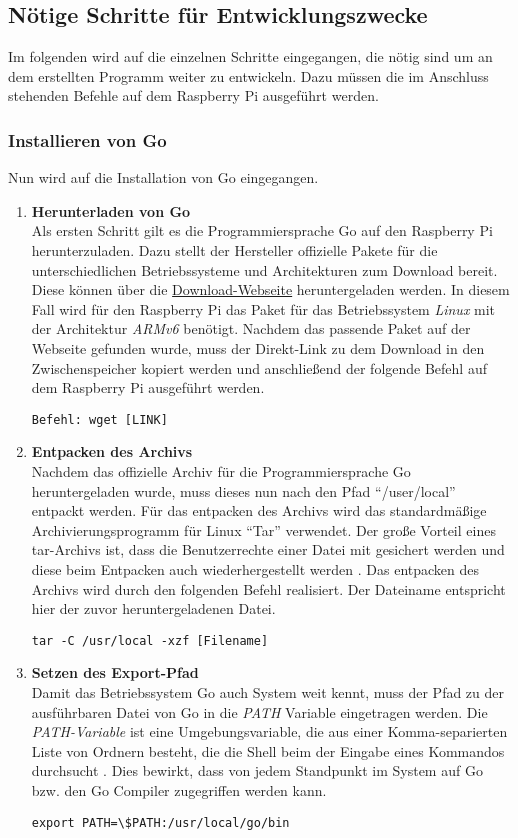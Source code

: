\subsection{Nötige Schritte für Entwicklungszwecke}
Im folgenden wird auf die einzelnen Schritte eingegangen, die nötig sind um an dem erstellten Programm weiter zu entwickeln. Dazu müssen die im Anschluss stehenden Befehle auf dem Raspberry Pi ausgeführt werden.
\subsubsection{Installieren von Go}
Nun wird auf die Installation von Go eingegangen.
\begin{enumerate}
\item \textbf{Herunterladen von Go}  \\
Als ersten Schritt gilt es die Programmiersprache Go auf den Raspberry Pi herunterzuladen. Dazu stellt der Hersteller offizielle Pakete für die unterschiedlichen Betriebssysteme und Architekturen zum Download bereit. Diese können über die \href{https://golang.org/dl/}{Download-Webseite} heruntergeladen werden. In diesem Fall wird für den Raspberry Pi das Paket für das Betriebssystem \textit{Linux} mit der Architektur \textit{ARMv6} benötigt. Nachdem das passende Paket auf der Webseite gefunden wurde, muss der Direkt-Link zu dem Download in den Zwischenspeicher kopiert werden und anschließend der folgende Befehl auf dem Raspberry Pi ausgeführt werden.
\begin{lstlisting}
Befehl: wget [LINK]
\end{lstlisting}

\item \textbf{Entpacken des Archivs}  \\
Nachdem das offizielle Archiv für die Programmiersprache Go heruntergeladen wurde, muss dieses nun nach den Pfad \enquote{/user/local} entpackt werden. Für das entpacken des Archivs wird das standardmäßige Archivierungsprogramm für Linux \enquote{\ac{Tar}} verwendet. Der große Vorteil eines tar-Archivs ist, dass die Benutzerrechte einer Datei mit gesichert werden und diese beim Entpacken auch wiederhergestellt werden \autocite{tar-wiki_2019}. Das entpacken des Archivs wird durch den folgenden Befehl realisiert. Der Dateiname entspricht hier der zuvor heruntergeladenen Datei.
\begin{lstlisting}
tar -C /usr/local -xzf [Filename]
\end{lstlisting}

\item \textbf{Setzen des Export-Pfad} \\
Damit das Betriebssystem Go auch System weit kennt, muss der Pfad zu der ausführbaren Datei von Go in die \textit{PATH} Variable eingetragen werden. Die \textit{PATH-Variable} ist eine Umgebungsvariable, die aus einer Komma-separierten Liste von Ordnern besteht, die die Shell beim der Eingabe eines Kommandos durchsucht \autocite{quigley_2000}. Dies bewirkt, dass von jedem Standpunkt im System auf Go bzw. den Go Compiler zugegriffen werden kann.
\begin{lstlisting}
export PATH=\$PATH:/usr/local/go/bin
\end{lstlisting}


\end{enumerate}
